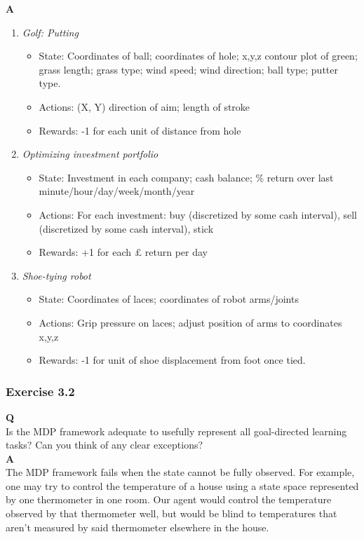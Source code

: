 \textbf{A}\\
\begin{enumerate}
	\item \textit{Golf: Putting}\\
	\begin{itemize}
		\item State: Coordinates of ball; coordinates of hole; x,y,z contour plot of green; grass length; grass type; wind speed; wind direction; ball type; putter type.
		\item Actions: (X, Y) direction of aim; length of stroke
		\item Rewards: -1 for each unit of distance from hole
	\end{itemize}
	\item \textit{Optimizing investment portfolio}
	\begin{itemize}
		\item State: Investment in each company; cash balance; \% return over last minute/hour/day/week/month/year
		\item Actions: For each investment: buy (discretized by some cash interval), sell (discretized by some cash interval), stick
		\item Rewards: +1 for each £ return per day 
	\end{itemize}
	\item \textit{Shoe-tying robot}
	\begin{itemize}
		\item State: Coordinates of laces; coordinates of robot arms/joints
		\item Actions: Grip pressure on laces; adjust position of arms to coordinates x,y,z
		\item Rewards: -1 for unit of shoe displacement from foot once tied.
	\end{itemize}
\end{enumerate}

\subsubsection{Exercise 3.2}
\textbf{Q}\\
Is the MDP framework adequate to usefully represent all goal-directed learning tasks? Can you think of any clear exceptions? \\

\textbf{A}\\
The MDP framework fails when the state cannot be fully observed. For example, one may try to control the temperature of a house using a state space represented by one thermometer in one room. Our agent would control the temperature observed by that thermometer well, but would be blind to temperatures that aren't measured by said thermometer elsewhere in the house.

